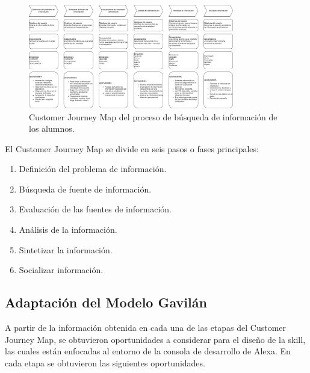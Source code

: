 \begin{figure}[H]
  \centering
  \includegraphics[width=0.80\textwidth]{Cap4/Figuras/Customer Journey Map Skill.jpg}
  \caption{Customer Journey Map del proceso de búsqueda de información de los alumnos.}
  \label{fig:415}
\end{figure}

El Customer Journey Map se divide en seis pasos o fases principales:

\begin{enumerate}
  \item Definición del problema de información.
  \item Búsqueda de fuente de información.
  \item Evaluación de las fuentes de información.
  \item Análisis de la información.
  \item Sintetizar la información.
  \item Socializar información.
\end{enumerate}


\subsection{Adaptación del Modelo Gavilán}
\label{AdaptacionModeloGavilancapIV}

A partir de la información obtenida en cada una de las etapas del Customer Journey Map, se obtuvieron oportunidades a considerar para el diseño de la skill, las cuales están enfocadas al entorno de la consola de desarrollo de Alexa. En cada etapa se obtuvieron las siguientes oportunidades.

